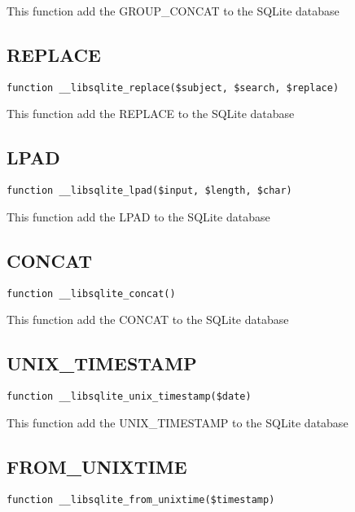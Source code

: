 \documentclass[a4paper]{book}
\begin{document}
This function add the GROUP\_CONCAT to the SQLite database

\hypertarget{toc294}{}
\subsection{REPLACE}

\begin{lstlisting}
function __libsqlite_replace($subject, $search, $replace)
\end{lstlisting}

This function add the REPLACE to the SQLite database

\hypertarget{toc295}{}
\subsection{LPAD}

\begin{lstlisting}
function __libsqlite_lpad($input, $length, $char)
\end{lstlisting}

This function add the LPAD to the SQLite database

\hypertarget{toc296}{}
\subsection{CONCAT}

\begin{lstlisting}
function __libsqlite_concat()
\end{lstlisting}

This function add the CONCAT to the SQLite database

\hypertarget{toc297}{}
\subsection{UNIX\_TIMESTAMP}

\begin{lstlisting}
function __libsqlite_unix_timestamp($date)
\end{lstlisting}

This function add the UNIX\_TIMESTAMP to the SQLite database

\hypertarget{toc298}{}
\subsection{FROM\_UNIXTIME}

\begin{lstlisting}
function __libsqlite_from_unixtime($timestamp)
\end{lstlisting}
\end{document}
